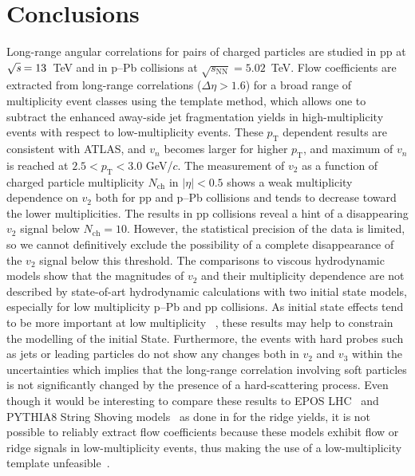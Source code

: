 
\section{Conclusions}
\label{sec:summary}
Long-range angular correlations for pairs of charged particles are studied in pp at ${\sqrt{{\textit s}}}=13$~TeV and in p--Pb collisions at $\sqrt{s_\mathrm{NN}} = 5.02$~TeV. Flow coefficients are extracted from long-range correlations ($\Delta\eta > 1.6$) for a broad range of multiplicity event classes using the template  method, which allows one to subtract the enhanced away-side jet fragmentation yields in high-multiplicity events with respect to low-multiplicity events.
These $p_\mathrm{T}$ dependent results are consistent with ATLAS, and $v_n$ becomes larger for higher $p_\mathrm{T}$, and maximum of $v_n$ is reached at $2.5<p_\mathrm{T}<3.0$ GeV/$c$. 
The measurement of $v_2$ as a function of charged particle multiplicity $N_{\mathrm{ch}}$ in $|\eta|<0.5$ shows a weak multiplicity dependence on $v_2$ both for pp and p--Pb collisions and tends to decrease toward the lower multiplicities. The results in pp collisions reveal a hint of a disappearing $v_2$ signal below $N_{\mathrm{ch}} = 10$. However, the statistical precision of the data is limited, so we cannot definitively exclude the possibility of a complete disappearance of the $v_2$ signal below this threshold. 
The comparisons to viscous hydrodynamic models show that the magnitudes of $v_2$ and their multiplicity dependence are not described by state-of-art hydrodynamic calculations with two initial state models, especially for low multiplicity p--Pb and pp collisions. As initial state effects tend to be more important at low multiplicity 
~\cite{Greif:2017bnr,Moreland:2018gsh}, these results may help to constrain the modelling of the initial
State.
Furthermore, the events with hard probes such as jets or leading particles do not show any changes both in $v_2$ and $v_3$ within the uncertainties which implies that the long-range correlation involving soft particles is not significantly changed by the presence of a hard-scattering process. 
Even though it would be interesting to compare these results to EPOS LHC~\cite{Pierog:2013ria} and PYTHIA8 String Shoving models~\cite{Bierlich:2017vhg,Bierlich:2019ixq} as done in \cite{ALICE:2012eyl} for the ridge yields, it is not possible to reliably extract flow coefficients because these models exhibit flow or ridge signals in low-multiplicity events, thus making the use of a low-multiplicity template unfeasible~\cite{Ji:2023eqn}.


